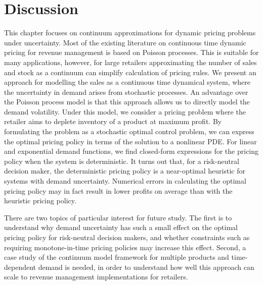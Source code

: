 \documentclass[main.tex]{subfiles}
\begin{document}

\section{Discussion}\label{sec:cts_conclusion}
This chapter focuses on continuum approximations for dynamic
pricing problems under uncertainty.
Most of the existing literature on continuous time dynamic pricing for
revenue management is based on Poisson
processes. This is suitable for many applications,
however, for large retailers approximating the number of sales and
stock as a continuum can simplify calculation of pricing rules.
We present an approach for modelling the sales as a continuous time
dynamical system, where the uncertainty in demand arises from
stochastic processes.
An advantage over the Poisson process model is that this approach
allows us to directly model the demand volatility.
Under this model, we consider a pricing problem where the retailer
aims to deplete  inventory of a product at maximum profit.
By formulating the problem as a stochastic optimal control problem,
we can express the optimal pricing policy in terms of the solution to
a nonlinear PDE.\@
For linear and exponential demand functions, we find closed-form
expressions for the pricing policy when the system is deterministic.
It turns out that, for a risk-neutral decision maker, the
deterministic pricing policy is a near-optimal heuristic for systems
with demand uncertainty.
Numerical errors in calculating the optimal pricing policy
may in fact result in lower profits on average than with the heuristic
pricing policy.

There are two topics of particular interest for future study.
The first is to understand why demand uncertainty has such a
small effect on the optimal pricing policy for risk-neutral decision
makers, and whether constraints such as requiring monotone-in-time pricing
policies may increase this effect. Second, a case study of the continuum
model framework for multiple products and time-dependent demand is
needed, in
order to understand how well this approach can scale to revenue
management implementations for retailers.




\biblio{} %
\end{document}

